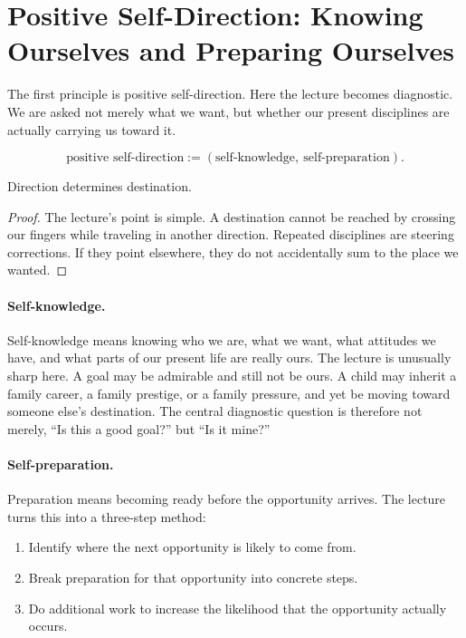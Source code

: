 \section{Positive Self-Direction: Knowing Ourselves and Preparing Ourselves}

The first principle is positive self-direction. Here the lecture becomes diagnostic. We are asked not merely what we want, but whether our present disciplines are actually carrying us toward it.

\begin{equation}
\text{positive self-direction} := (\text{self-knowledge},\ \text{self-preparation}).
\end{equation}

\begin{proposition}
Direction determines destination.
\end{proposition}

\begin{proof}
The lecture's point is simple. A destination cannot be reached by crossing our fingers while traveling in another direction. Repeated disciplines are steering corrections. If they point elsewhere, they do not accidentally sum to the place we wanted.
\end{proof}

\paragraph{Self-knowledge.}
Self-knowledge means knowing who we are, what we want, what attitudes we have, and what parts of our present life are really ours. The lecture is unusually sharp here. A goal may be admirable and still not be ours. A child may inherit a family career, a family prestige, or a family pressure, and yet be moving toward someone else's destination. The central diagnostic question is therefore not merely, ``Is this a good goal?'' but ``Is it mine?''

\paragraph{Self-preparation.}
Preparation means becoming ready before the opportunity arrives. The lecture turns this into a three-step method:
\begin{enumerate}
\item Identify where the next opportunity is likely to come from.
\item Break preparation for that opportunity into concrete steps.
\item Do additional work to increase the likelihood that the opportunity actually occurs.
\end{enumerate}

